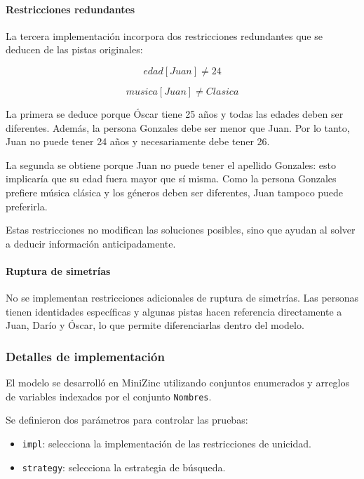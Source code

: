 \paragraph{Restricciones redundantes}

La tercera implementación incorpora dos restricciones redundantes que se deducen de las pistas originales:

\[
edad[Juan] \neq 24
\]

\[
musica[Juan] \neq Clasica
\]

La primera se deduce porque Óscar tiene 25 años y todas las edades deben ser diferentes. Además, la persona Gonzales debe ser menor que Juan. Por lo tanto, Juan no puede tener 24 años y necesariamente debe tener 26.

La segunda se obtiene porque Juan no puede tener el apellido Gonzales: esto implicaría que su edad fuera mayor que sí misma. Como la persona Gonzales prefiere música clásica y los géneros deben ser diferentes, Juan tampoco puede preferirla.

Estas restricciones no modifican las soluciones posibles, sino que ayudan al solver a deducir información anticipadamente.

\paragraph{Ruptura de simetrías}

No se implementan restricciones adicionales de ruptura de simetrías. Las personas tienen identidades específicas y algunas pistas hacen referencia directamente a Juan, Darío y Óscar, lo que permite diferenciarlas dentro del modelo.

\subsubsection{Detalles de implementación}

El modelo se desarrolló en MiniZinc utilizando conjuntos enumerados y arreglos de variables indexados por el conjunto \texttt{Nombres}.

Se definieron dos parámetros para controlar las pruebas:

\begin{itemize}
    \item \texttt{impl}: selecciona la implementación de las restricciones de unicidad.
    \item \texttt{strategy}: selecciona la estrategia de búsqueda.
\end{itemize}

